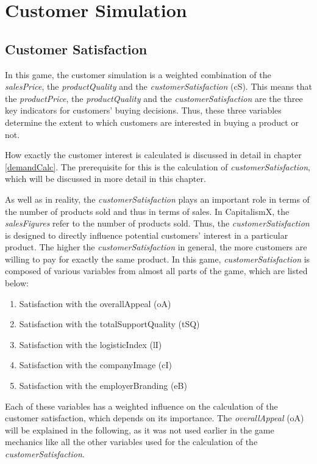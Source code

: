 \section{Customer Simulation} \label{sec:customsim}

\subsection{Customer Satisfaction}
In this game, the customer simulation is a weighted combination of the \textit{salesPrice}, the \textit{productQuality} and the \textit{customerSatisfaction} (\gls{cS}).
This means that the \textit{productPrice}, the \textit{productQuality} and the \textit{customerSatisfaction} are the three key indicators for customers' buying decisions. Thus, these three variables determine the extent to which customers are interested in buying a product or not.

How exactly the customer interest is calculated is discussed in detail in chapter \ref{demandCalc}. The prerequisite for this is the calculation of \textit{customerSatisfaction}, which will be discussed in more detail in this chapter.

As well as in reality, the \textit{customerSatisfaction} plays an important role in terms of the number of products sold and thus in terms of sales. \cite{deptolla_effects_2004} In CapitalismX, the \textit{salesFigures} refer to the number of products sold.
Thus, the \textit{customerSatisfaction} is designed to directly influence potential customers' interest in a particular product. The higher the \textit{customerSatisfaction} in general, the more customers are willing to pay for exactly the same product. 
In this game, \textit{customerSatisfaction} is composed of various variables from almost all parts of the game, which are listed below:
\begin{enumerate}
      \item Satisfaction with the overallAppeal (oA)
      \item Satisfaction with the totalSupportQuality (tSQ)
      \item Satisfaction with the logisticIndex (lI)
      \item Satisfaction with the companyImage (cI)
      \item Satisfaction with the employerBranding (eB)
\end{enumerate}
Each of these variables has a weighted influence on the calculation of the customer satisfaction, which depends on its importance.
The \textit{overallAppeal} (oA) will be explained in the following, as it was not used earlier in the game mechanics like all the other variables used for the calculation of the \textit{customerSatisfaction}.

